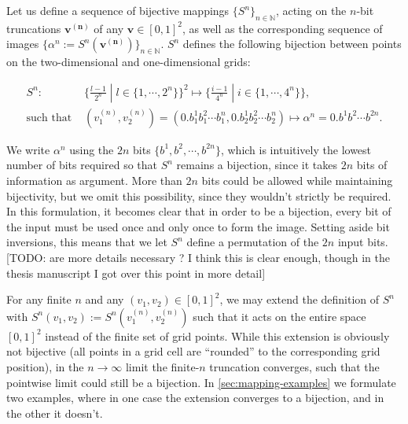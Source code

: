 \documentclass[10pt,letterpaper]{article}
\renewcommand{\vec}[1]{\boldsymbol{#1}}
\begin{document}
Let us define a sequence of bijective mappings $\{S^n\}_{n \in \mathbb N}$, acting on the $n$-bit truncations $\vec{v^{(n)}}$ of any $\vec{v} \in [0,1]^2$, as well as the corresponding sequence of images $\{\alpha^n := S^n(\vec{v^{(n)}})\}_{n \in \mathbb N}$. $S^n$ defines the following bijection between points on the two-dimensional and one-dimensional grids:

\begin{equation} \label{eq:def-S} \begin{aligned}
S^n :& \{\tfrac{l-1}{2^n}\;|\;l\in\{1,\cdots,2^n\}\}^2 \mapsto \{\tfrac{i-1}{4^n}\;|\;i\in\{1,\cdots,4^n\}\},\\
\text{such that }&(v_1^{(n)}, v_2^{(n)}) = (0.b_1^1 b_1^2 \cdots b_1^n, 0.b_2^1 b_2^2 \cdots b_2^n) \mapsto \alpha^n = 0.b^1 b^2 \cdots b^{2n}.
\end{aligned} \end{equation}


We write $\alpha^n$ using the $2n$ bits $\{b^1, b^2, \cdots, b^{2n}\}$, which is intuitively the lowest number of bits required so that $S^n$ remains a bijection, since it takes $2n$ bits of information as argument. More than $2n$ bits could be allowed while maintaining bijectivity, but we omit this possibility, since they wouldn't strictly be required. In this formulation, it becomes clear that in order to be a bijection, every bit of the input must be used once and only once to form the image. Setting aside bit inversions, this means that we let $S^n$ define a permutation of the $2n$ input bits. [TODO: are more details necessary ? I think this is clear enough, though in the thesis manuscript I got over this point in more detail]

For any finite $n$ and any $(v_1,v_2) \in [0,1]^2$, we may extend the definition of $S^n$ with $S^n(v_1, v_2) := S^n(v_1^{(n)}, v_2^{(n)})$ such that it acts on the entire space $[0,1]^2$ instead of the finite set of grid points. While this extension is obviously not bijective (all points in a grid cell are ``rounded'' to the corresponding grid position), in the $n \to \infty$ limit the finite-$n$ truncation converges, such that the pointwise limit could still be a bijection. In \autoref{sec:mapping-examples} we formulate two examples, where in one case the extension converges to a bijection, and in the other it doesn't.
\end{document}

